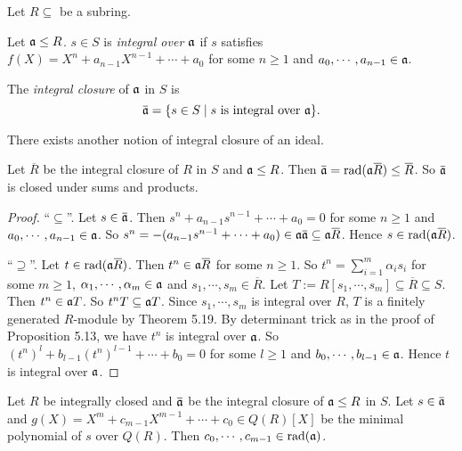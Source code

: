 \noindent Let $R \subseteq $ be a subring.

\begin{definition}
    Let $\mathfrak{a} \leq R$. $s \in S$ is \emph{integral over $\mathfrak{a}$} if $s$ satisfies $f(X) = X^{n} + a_{n-1}X^{n-1} + \cdots + a_0$ for some $n \geq 1$ and $a_0,\cdots,a_{n-1} \in \mathfrak{a}$. \par 
    The \emph{integral closure} of $\mathfrak{a}$ in $S$ is 
    \[\overbar{\ffa} = \{s \in S \mid s \text{ is integral over $\ffa$}\}.\]
\end{definition}

\begin{warning}
    There exists another notion of integral closure of an ideal.
\end{warning}

\begin{lemma}
    Let $\overbar{R}$ be the integral closure of $R$ in $S$ and $\mathfrak{a} \leq R$. Then $\overbar{\ffa} = \operatorname{rad}(\ffa \overbar{R}) \leq \overbar{R}$. So $\overbar{\ffa}$ is closed under sums and products.
\end{lemma}

\begin{proof}
    ``$\subseteq$''. Let $s \in \overbar{\ffa}$. Then $s^{n} + a_{n-1}s^{n-1} + \cdots + a_0 = 0$ for some $n \geq 1$ and $a_0,\cdots,a_{n-1} \in \mathfrak{a}$. So $s^{n} = -(a_{n-1}s^{n-1} + \cdots + a_0) \in \ffa \overbar{\ffa} \subseteq \ffa \overbar{R}$. Hence $s \in \operatorname{rad}(\ffa \overbar{R})$. \par 
    ``$\supseteq$''. Let $t \in \operatorname{rad}(\ffa \overbar{R})$. Then $t^{n} \in \ffa \overbar{R}$ for some $n \geq 1$. So $t^{n} = \sum_{i=1}^{m} \alpha_is_i$ for some $m \geq 1$, $\alpha_1,\cdots,\alpha_m \in \mathfrak{a}$ and $s_1,\cdots,s_m \in \overbar{R}$. Let $T := R[s_1,\cdots,s_m] \subseteq \overbar{R} \subseteq S$. Then $t^{n} \in \mathfrak{a} T$. So $t^{n}T \subseteq \mathfrak{a} T$. Since $s_1,\cdots,s_m$ is integral over $R$, $T$ is a finitely generated $R$-module by Theorem 5.19. By determinant trick as in the proof of Proposition 5.13, we have $t^{n}$ is integral over $\mathfrak{a}$. So $(t^{n})^{l} + b_{l-1}(t^{n})^{l-1} + \cdots + b_0 = 0$ for some $l \geq 1$ and $b_0,\cdots,b_{l-1} \in \mathfrak{a}$. Hence $t$ is integral over $\mathfrak{a}$.
\end{proof}

\begin{proposition}
    Let $R$ be integrally closed and $\overbar{\ffa}$ be the integral closure of $\mathfrak{a} \leq R$ in $S$. Let $s \in \overbar{\ffa}$ and $g(X) = X^{m} + c_{m-1}X^{m-1} + \cdots + c_0 \in Q(R)[X]$ be the minimal polynomial of $s$ over $Q(R)$. Then $c_0,\cdots,c_{m-1} \in \operatorname{rad}(\mathfrak{a})$.
\end{proposition}

